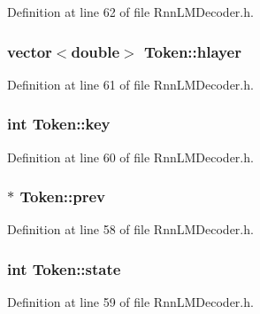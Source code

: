 Definition at line 62 of file Rnn\+L\+M\+Decoder.\+h.

\subsubsection[{hlayer}]{\setlength{\rightskip}{0pt plus 5cm}vector$<$double$>$ Token\+::hlayer\hspace{0.3cm}{\ttfamily [mutable]}}\hypertarget{class_token_a55d0874ef8b2bf1495d09a39307bdee7}{}\label{class_token_a55d0874ef8b2bf1495d09a39307bdee7}


Definition at line 61 of file Rnn\+L\+M\+Decoder.\+h.

\subsubsection[{key}]{\setlength{\rightskip}{0pt plus 5cm}int Token\+::key\hspace{0.3cm}{\ttfamily [mutable]}}\hypertarget{class_token_ad0913b74b0ae9efb9eee1cc006eb43c6}{}\label{class_token_ad0913b74b0ae9efb9eee1cc006eb43c6}


Definition at line 60 of file Rnn\+L\+M\+Decoder.\+h.

\subsubsection[{prev}]{$\ast$ Token\+::prev\hspace{0.3cm}{\ttfamily [mutable]}}\hypertarget{class_token_a816e682effa4d369c3ab17e77d8ce3e2}{}\label{class_token_a816e682effa4d369c3ab17e77d8ce3e2}


Definition at line 58 of file Rnn\+L\+M\+Decoder.\+h.

\subsubsection[{state}]{\setlength{\rightskip}{0pt plus 5cm}int Token\+::state}\hypertarget{class_token_ac90523529338b2dfc3f0ced3f10c7e55}{}\label{class_token_ac90523529338b2dfc3f0ced3f10c7e55}


Definition at line 59 of file Rnn\+L\+M\+Decoder.\+h.


